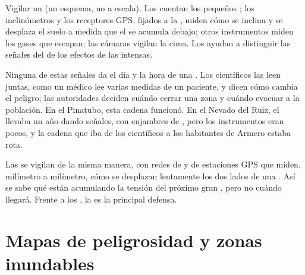 \begin{omfigure}
{\small Vigilar un  (un esquema, no a escala). Los 
cuentan los pequeños ; los inclinómetros y los receptores GPS,
fijados a la , miden cómo se inclina y se desplaza el suelo a medida
que el  se acumula debajo; otros instrumentos miden los gases que
escapan; las cámaras vigilan la cima. Los  ayudan a distinguir
las señales del  de los efectos de las  intensas.}
\label{fig:g9:natural-risks:monitoring}
\end{omfigure}

Ninguna de estas señales da el día y la hora de una . Los
científicos las leen juntas, como un médico lee varias medidas de un
paciente, y dicen cómo cambia el peligro; las autoridades deciden cuándo
cerrar una zona y cuándo evacuar a la población. En el Pinatubo, esta
cadena funcionó. En el Nevado del Ruiz, el  llevaba un año dando
señales, con enjambres de , pero los instrumentos eran pocos, y
la cadena que iba de los científicos a los habitantes de Armero estaba
rota.

Las  se vigilan de la misma manera, con redes de  y de
estaciones GPS que miden, milímetro a milímetro, cómo se desplazan
lentamente los dos lados de una . Así se sabe qué  están
acumulando la tensión del próximo gran , pero no cuándo llegará.
Frente a los , la  es la principal defensa.

\section{Mapas de peligrosidad y zonas inundables}

